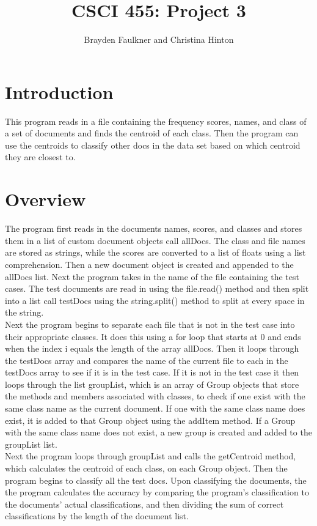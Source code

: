 \documentclass[12pt]{article}
\author{Brayden Faulkner and Christina Hinton}
\title{CSCI 455: Project 3}
\begin{document}
\maketitle
\section{Introduction}
\indent This program reads in a file containing the frequency scores, names, and class of a set of documents and finds the centroid of each class. Then the program can use the centroids to classify other docs in the data set based on which centroid they are closest to.
\section{Overview}
\indent The program first reads in the documents names, scores, and classes and stores them in a list of custom document objects call allDocs. The class and file names are stored as strings, while the scores are converted to a list of floats using a list comprehension. Then a new document object is created and appended to the allDocs list. Next the program takes in the name of the file containing the test cases. The test documents are read in using the file.read() method and then split into a list call testDocs using the string.split() method to split at every space in the string. \\
\indent Next the program begins to separate each file that is not in the test case into their appropriate classes. It does this using a for loop that starts at 0 and ends when the index i equals the length of the array allDocs. Then it loops through the testDocs array and compares the name of the current file to each in the testDocs array to see if it is in the test case. If it is not in the test case it then loops through the list groupList, which is an array of Group objects that store the methods and members associated with classes, to check if one exist with the same class name as the current document. If one with the same class name does exist, it is added to that Group object using the addItem method. If a Group with the same class name does not exist, a new group is created and added to the groupList list. \\
\indent Next the program loops through groupList and calls the getCentroid method, which calculates the centroid of each class, on each Group object. Then the program begins to classify all the test docs. Upon classifying the documents, the the program calculates the accuracy by comparing the program's classification to the documents' actual classifications, and then dividing the sum of correct classifications by the length of the document list. \\
\end{document}
